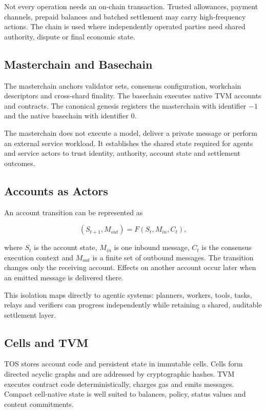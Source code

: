\documentclass[11pt,oneside]{article}
\begin{document}
Not every operation needs an on-chain transaction. Trusted allowances, payment channels,
prepaid balances and batched settlement may carry high-frequency actions. The chain is used
where independently operated parties need shared authority, dispute or final economic state.

\subsection{Masterchain and Basechain}

The masterchain anchors validator sets, consensus configuration, workchain descriptors and
cross-shard finality. The basechain executes native TVM accounts and contracts. The canonical
genesis registers the masterchain with identifier $-1$ and the native basechain with identifier
$0$.

The masterchain does not execute a model, deliver a private message or perform an external
service workload. It establishes the shared state required for agents and service actors to
trust identity, authority, account state and settlement outcomes.

\subsection{Accounts as Actors}

An account transition can be represented as

\[
  (S_{t+1}, M_{out}) = F(S_t, M_{in}, C_t),
\]

where $S_t$ is the account state, $M_{in}$ is one inbound message, $C_t$ is the consensus
execution context and $M_{out}$ is a finite set of outbound messages. The transition changes
only the receiving account. Effects on another account occur later when an emitted message is
delivered there.

This isolation maps directly to agentic systems: planners, workers, tools, tasks, relays and
verifiers can progress independently while retaining a shared, auditable settlement layer.

\subsection{Cells and TVM}

TOS stores account code and persistent state in immutable cells. Cells form directed acyclic
graphs and are addressed by cryptographic hashes. TVM executes contract code deterministically,
charges gas and emits messages. Compact cell-native state is well suited to balances, policy,
status values and content commitments.
\end{document}
